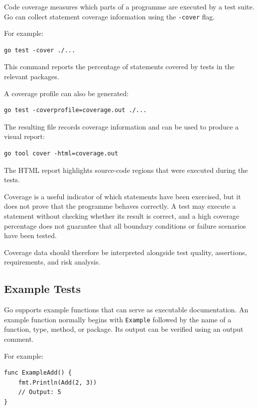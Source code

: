 Code coverage measures which parts of a programme are executed by a test suite. Go can collect statement coverage information using the \texttt{-cover} flag.

For example:

\begin{lstlisting}
go test -cover ./...
\end{lstlisting}

This command reports the percentage of statements covered by tests in the relevant packages.

A coverage profile can also be generated:

\begin{lstlisting}
go test -coverprofile=coverage.out ./...
\end{lstlisting}

The resulting file records coverage information and can be used to produce a visual report:

\begin{lstlisting}
go tool cover -html=coverage.out
\end{lstlisting}

The HTML report highlights source-code regions that were executed during the tests.

Coverage is a useful indicator of which statements have been exercised, but it does not prove that the programme behaves correctly. A test may execute a statement without checking whether its result is correct, and a high coverage percentage does not guarantee that all boundary conditions or failure scenarios have been tested.

Coverage data should therefore be interpreted alongside test quality, assertions, requirements, and risk analysis.

\subsection{Example Tests}

Go supports example functions that can serve as executable documentation. An example function normally begins with \texttt{Example} followed by the name of a function, type, method, or package. Its output can be verified using an output comment.

For example:

\begin{lstlisting}
func ExampleAdd() {
    fmt.Println(Add(2, 3))
    // Output: 5
}
\end{lstlisting}


